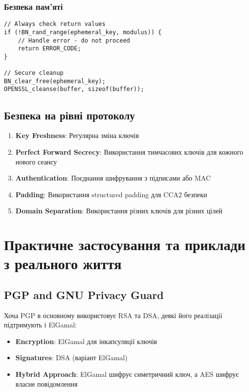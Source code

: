 \subsubsection{Безпека пам'яті}

\begin{verbatim}
// Always check return values
if (!BN_rand_range(ephemeral_key, modulus)) {
    // Handle error - do not proceed
    return ERROR_CODE;
}

// Secure cleanup
BN_clear_free(ephemeral_key);
OPENSSL_cleanse(buffer, sizeof(buffer));
\end{verbatim}

\subsection{Безпека на рівні протоколу}

\begin{enumerate}
    \item \textbf{Key Freshness}: Регулярна зміна ключів
    \item \textbf{Perfect Forward Secrecy}: Використання тимчасових ключів для кожного нового сеансу
    \item \textbf{Authentication}: Поєднання шифрування з підписами або MAC
    \item \textbf{Padding}: Використання structured padding для CCA2 безпеки
    \item \textbf{Domain Separation}: Використання різних ключів для різних цілей
\end{enumerate}

\section{Практичне застосування та приклади з реального життя}

\subsection{PGP and GNU Privacy Guard}

Хоча PGP в основному використовує RSA та DSA, деякі його реалізації підтримують і ElGamal:
\begin{itemize}
    \item \textbf{Encryption}: ElGamal для інкапсуляції ключів
    \item \textbf{Signatures}: DSA (варіант ElGamal)
    \item \textbf{Hybrid Approach}: ElGamal шифрує симетричний ключ, а AES шифрує власне повідомлення
\end{itemize}

